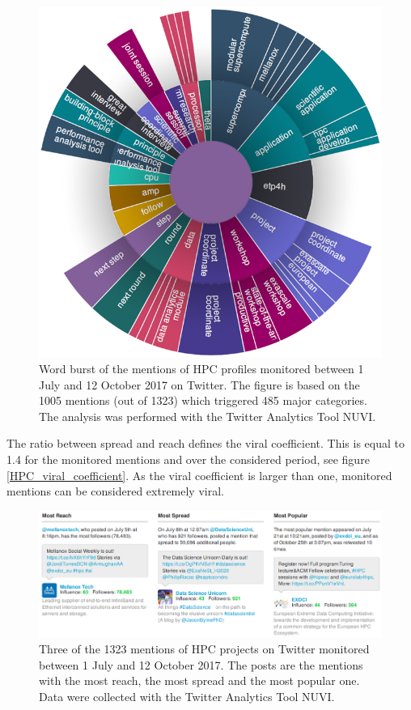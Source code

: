 \begin{figure}[!t] 
 \begin{center}
 \includegraphics[scale=0.64]{Images/HPC_word_burst.png}
 \caption{Word burst of the mentions of HPC profiles monitored between 1 July and 12 October 2017 on Twitter. The figure is based on the 1005 mentions (out of 1323) which triggered 485 major categories. The analysis was performed with the Twitter Analytics Tool NUVI.}
 \label{HPC_word_burst}
 \end{center}
\end{figure}

The ratio between spread and reach defines the viral coefficient. This is equal to 1.4 for the monitored mentions and over the considered period, see figure \ref{HPC_viral_coefficient}. As the viral coefficient is larger than one, monitored mentions can be considered extremely viral. 

\begin{figure}[!t] 
 \begin{center}
 \includegraphics[scale=0.47]{Images/HPC_Most_reach_spread_popular.png}
 \caption{Three of the 1323 mentions of HPC projects on Twitter monitored between 1 July and 12 October 2017. The posts are the mentions with the most reach, the most spread and the most popular one. Data were collected with the Twitter Analytics Tool NUVI.}
 \label{HPC_Most_reach_spread_popular}
 \end{center}
\end{figure}

